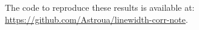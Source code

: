 \documentclass{rnaastex}
\begin{document}
The code to reproduce these results is available at: \url{https://github.com/Astroua/linewidth-corr-note}.


\end{document}
